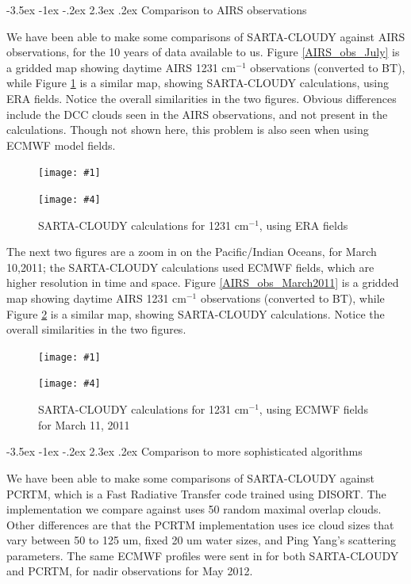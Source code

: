 \documentclass[11pt]{article}
\makeatletter
\newcommand{\sasc}{\textsf{SARTA-CLOUDY}\xspace}
\newcommand{\pcrtm}{\textsf{PCRTM}\xspace}
\newcommand{\dfigure}[6]
{
\begin{figure}
  \begin{minipage}[t]{0.45\textwidth}
  \centering
  \texttt{[image: \#1]}
   \caption{#2}  \label{#3}
  \end{minipage}
  \hfil
  \begin{minipage}[t]{0.45\linewidth}
  \centering
  \texttt{[image: \#4]}
   \caption{#5}  \label{#6}
  \end{minipage}
\end{figure}
}
\newcommand{\wn}{cm$^{-1}$\xspace}
\renewcommand{\section}{\@startsection {section}{1}{\z@}%
                                   {-3.5ex \@plus -1ex \@minus -.2ex}%
                                   {2.3ex \@plus.2ex}%
                                   {\reset@font\large\bfseries}}
\makeatother
\begin{document}
\section{Comparison to AIRS observations}

We have been able to make some comparisons of \sasc against AIRS observations, for the 10 years of data available 
to us. Figure \ref{AIRS_obs_July} is a gridded map showing daytime AIRS 1231 \wn observations (converted to BT),
while Figure \ref{SARTA_calc_July} is a similar map, showing \sasc calculations, using ERA fields. Notice the 
overall similarities in the two figures. Obvious differences include the DCC clouds seen in the AIRS observations,
and not present in the calculations. Though not shown here, this problem is also seen when using ECMWF model fields.
\dfigure{Figs/globalBT1231obs2_crop}{AIRS BT1231 \wn observations}{AIRS_obs_July}{Figs/globalBT1231era2_crop}{\sasc calculations for 1231 \wn, using ERA fields}{SARTA_calc_July}

The next two figures are a zoom in on the Pacific/Indian Oceans, for March 10,2011; the \sasc calculations
used ECMWF fields, which are higher resolution in time and space. 
Figure \ref{AIRS_obs_March2011} is a gridded map showing daytime AIRS 1231 \wn observations (converted to BT),
while Figure \ref{SARTA_calc_March2011} is a similar map, showing \sasc calculations. Notice the 
overall similarities in the two figures. 

\dfigure{Figs/airs_bt_image}{AIRS BT1231 \wn observations for March 11, 2011}{AIRS_obs_March2011}{Figs/ecmwf_bt_image}{\sasc calculations for 1231 \wn, using ECMWF fields for March 11, 2011}{SARTA_calc_March2011}

\section{Comparison to more sophisticated algorithms}

We have been able to make some comparisons of \sasc against \pcrtm, which is a Fast Radiative Transfer code trained using 
DISORT. The implementation we compare against uses 50 random maximal overlap clouds. Other differences are that 
the \pcrtm implementation uses ice cloud sizes that vary between 50 to 125 um, fixed 20 um water sizes, and 
Ping Yang's scattering parameters. The same ECMWF profiles were sent in for both \sasc and \pcrtm, for nadir 
observations for May 2012.
\end{document}
